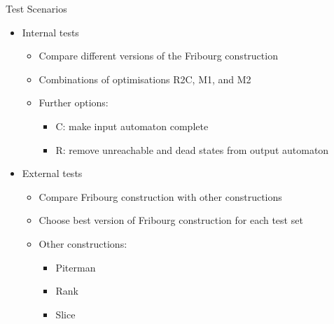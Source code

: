 \documentclass[12pt]{beamer}
\begin{document}
\begin{frame}{Test Scenarios}
\begin{itemize}\itemsep5pt
\item Internal tests 
  \begin{itemize}\itemsep3pt
  \item Compare different versions of the Fribourg construction
  \item Combinations of optimisations R2C, M1, and M2
  \item Further options:
    \begin{itemize} \itemsep1pt
    \item C: make input automaton complete
    \item R: remove unreachable and dead states from output automaton
    \end{itemize}
  \end{itemize}
\pause
\item External tests
  \begin{itemize}\itemsep3pt
  \item Compare Fribourg construction with other constructions
  \item Choose best version of Fribourg construction for each test set
  \item Other constructions:
    \begin{itemize} \itemsep1pt
    \item Piterman \tabto{1.5cm} \cite{2006_piterman,2007_piterman}
    \item Rank     \tabto{1.5cm} \cite{schewe2009buchi}
    \item Slice    \tabto{1.5cm} \cite{vardi2007automata}
    \end{itemize}
  \end{itemize}
\end{itemize}
\end{frame}
\end{document}
